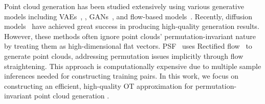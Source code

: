 %



Point cloud generation has been studied extensively using various generative models including VAEs~\cite{kim2021setvae}, , GANs~\cite{achlioptas2018learning,shu20193d,li2021sp}, and flow-based models~\cite{yang2019pointflow,kim2020softflow}.
%
Recently, diffusion models~\cite{zeng2022lion,zhou2021pvd,luo2021diffusion,pang2024SE3,zhao2025decompose} have achieved great success in producing high-quality generation results. 
%
However, these methods often ignore point clouds' permutation-invariant nature  by treating them as high-dimensional flat vectors.
%
PSF~\cite{wu2023psf} uses Rectified flow~\cite{liu2022flow} to generate point clouds, addressing permutation issues implicitly through flow straightening.
%
This approach is computationally expensive due to multiple sample inferences needed for constructing training pairs.
%
In this work, we focus on constructing an efficient, high-quality OT approximation for permutation-invariant point cloud generation .



